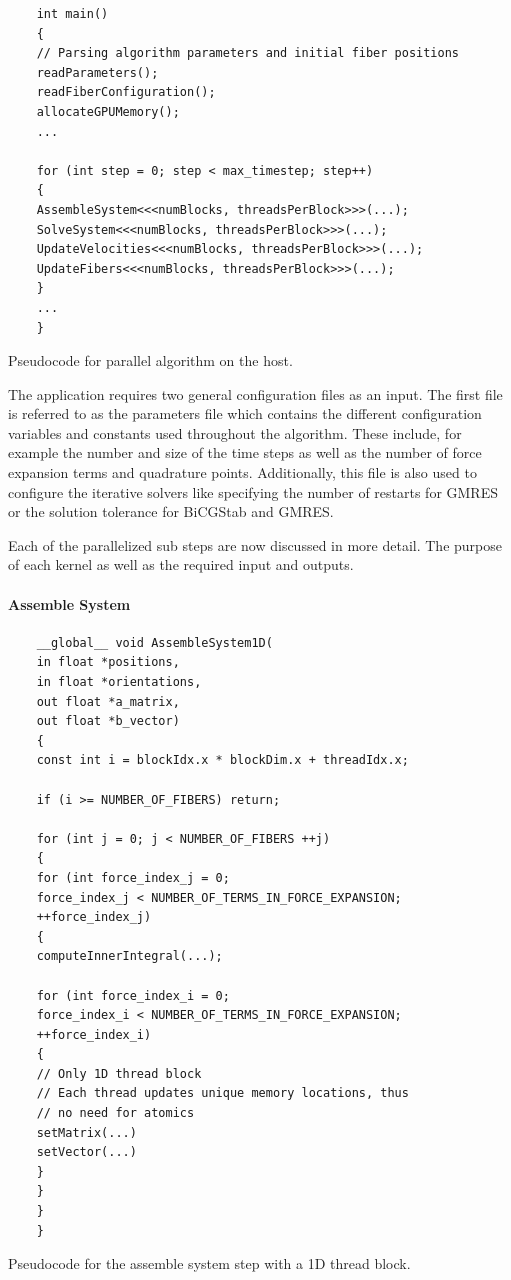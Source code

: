 \begin{listing}[!htbp]
  \centering
  \begin{verbatim}
    int main()
    {
    // Parsing algorithm parameters and initial fiber positions
    readParameters();
    readFiberConfiguration();
    allocateGPUMemory();
    ...

    for (int step = 0; step < max_timestep; step++)
    {
    AssembleSystem<<<numBlocks, threadsPerBlock>>>(...);
    SolveSystem<<<numBlocks, threadsPerBlock>>>(...);
    UpdateVelocities<<<numBlocks, threadsPerBlock>>>(...);
    UpdateFibers<<<numBlocks, threadsPerBlock>>>(...);
    }
    ...
    }
  \end{verbatim}
  \caption{Pseudocode for parallel algorithm on the host.}
  \label{lst:pseudo_parallel_algorithm}
\end{listing}

The application requires two general configuration files as an input. The first file is referred to as the parameters file which contains the different configuration variables and constants used throughout the algorithm. These include, for example the number and size of the time steps as well as the number of force expansion terms and quadrature points. Additionally, this file is also used to configure the iterative solvers like specifying the number of restarts for GMRES or the solution tolerance for BiCGStab and GMRES.

Each of the parallelized sub steps are now discussed in more detail. The purpose of each kernel as well as the required input and outputs.

\paragraph{Assemble System}

\begin{listing}[!htbp]
  \centering
  \begin{verbatim}
    __global__ void AssembleSystem1D(
    in float *positions,
    in float *orientations,
    out float *a_matrix,
    out float *b_vector)
    {
    const int i = blockIdx.x * blockDim.x + threadIdx.x;

    if (i >= NUMBER_OF_FIBERS) return;

    for (int j = 0; j < NUMBER_OF_FIBERS ++j)
    {
    for (int force_index_j = 0;
    force_index_j < NUMBER_OF_TERMS_IN_FORCE_EXPANSION;
    ++force_index_j)
    {
    computeInnerIntegral(...);

    for (int force_index_i = 0;
    force_index_i < NUMBER_OF_TERMS_IN_FORCE_EXPANSION;
    ++force_index_i)
    {
    // Only 1D thread block
    // Each thread updates unique memory locations, thus
    // no need for atomics
    setMatrix(...)
    setVector(...)
    }
    }
    }
    }
  \end{verbatim}
  \caption{Pseudocode for the assemble system step with a 1D thread block.}
  \label{lst:pseudo_assemble_system}
\end{listing}

